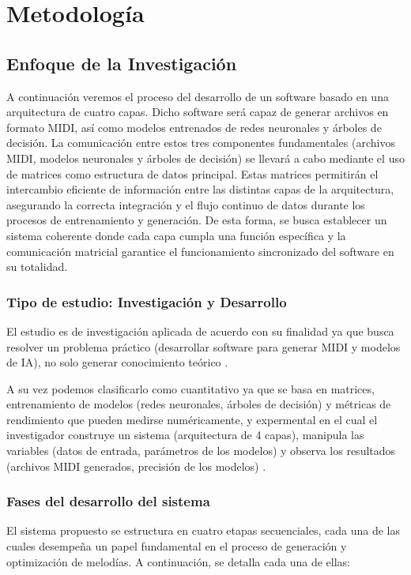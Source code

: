 \documentclass[12pt]{report}
\begin{document}
\chapter{Metodología} 

\section{Enfoque de la Investigación}
A continuación veremos el proceso del desarrollo de un software basado en una arquitectura de cuatro capas. Dicho software será capaz de generar archivos en formato MIDI, así como modelos entrenados de redes neuronales y árboles de decisión. La comunicación entre estos tres componentes fundamentales (archivos MIDI, modelos neuronales y árboles de decisión) se llevará a cabo mediante el uso de matrices como estructura de datos principal. Estas matrices permitirán el intercambio eficiente de información entre las distintas capas de la arquitectura, asegurando la correcta integración y el flujo continuo de datos durante los procesos de entrenamiento y generación. De esta forma, se busca establecer un sistema coherente donde cada capa cumpla una función específica y la comunicación matricial garantice el funcionamiento sincronizado del software en su totalidad.

\subsection{Tipo de estudio: Investigación y Desarrollo}
El estudio es de investigación aplicada de acuerdo con su finalidad ya que busca resolver un problema práctico (desarrollar software para generar MIDI y modelos de IA), no solo generar conocimiento teórico \cite{dresch2015}. 

A su vez podemos clasificarlo como cuantitativo ya que se basa en matrices, entrenamiento de modelos (redes neuronales, árboles de decisión) y métricas de rendimiento que pueden medirse numéricamente, y expermental en el cual el investigador construye un sistema (arquitectura de 4 capas), manipula las variables (datos de entrada, parámetros de los modelos) y observa los resultados (archivos MIDI generados, precisión de los modelos) \cite{wohlin2012}.

\subsection{Fases del desarrollo del sistema}
El sistema propuesto se estructura en cuatro etapas secuenciales, cada una de las cuales desempeña un papel fundamental en el proceso de generación y optimización de melodías. A continuación, se detalla cada una de ellas:
\end{document}
